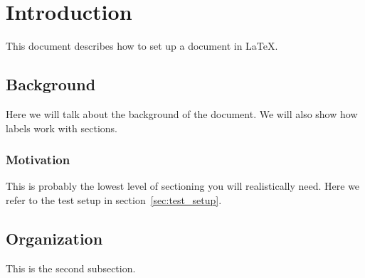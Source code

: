 \section{Introduction}

This document describes how to set up a document in \LaTeX.

\subsection{Background}\label{sec:background}

Here we will talk about the background of the document. We will also show how labels work with sections.

\subsubsection{Motivation}

This is probably the lowest level of sectioning you will realistically need. Here we refer to the test setup in section~\ref{sec:test_setup}.

\subsection{Organization}

This is the second subsection.
